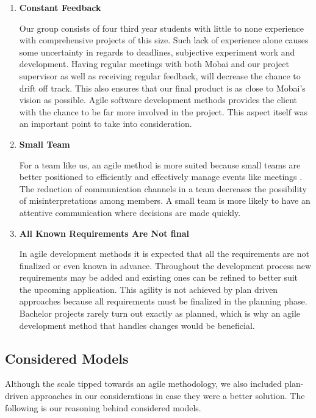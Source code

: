 \begin{enumerate}
    \item \textbf{Constant Feedback} 
    
    \hspace{0,5cm}Our group consists of four third year students with little to none experience with comprehensive projects of this size. Such lack of experience alone causes some uncertainty in regards to deadlines, subjective experiment work and development. Having regular meetings with both Mobai and our project supervisor as well as receiving regular feedback, will decrease the chance to drift off track. This also ensures that our final product is as close to Mobai's vision as possible. Agile software development methods provides the client with the chance to be far more involved in the project. This aspect itself was an important point to take into consideration.
        
    \item \textbf{Small Team}
    
    \hspace{0,5cm}For a team like us, an agile method is more suited because small teams are better positioned to efficiently and effectively manage events like meetings \cite{SmallTeams}. The reduction of communication channels in a team decreases the possibility of misinterpretations among members. A small team is more likely to have an attentive communication where decisions are made quickly.
    \newpage
    
    \item \textbf{All Known Requirements Are Not final}
    
    \hspace{0,5cm}In agile development methods it is expected that all the requirements are not finalized or even known in advance. Throughout the development process new requirements may be added and existing ones can be refined to better suit the upcoming application. This agility is not achieved by plan driven approaches because all requirements must be finalized in the planning phase. Bachelor projects rarely turn out exactly as planned, which is why an agile development method that handles changes would be beneficial. 
\end{enumerate}

\subsection{Considered Models}
Although the scale tipped towards an agile methodology, we also included plan-driven approaches in our considerations in case they were a better solution. The following is our reasoning behind considered models.  

